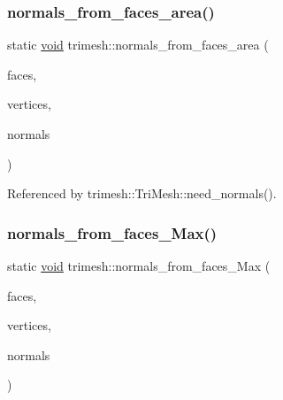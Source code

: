 \subsubsection{\texorpdfstring{normals\+\_\+from\+\_\+faces\+\_\+area()}{normals\_from\_faces\_area()}}
{\footnotesize\ttfamily static \hyperlink{namespacetrimesh_a784ddfd979e1c579bda795a8edfc3f43}{void} trimesh\+::normals\+\_\+from\+\_\+faces\+\_\+area (\begin{DoxyParamCaption}\item[{vector$<$ \hyperlink{classtrimesh_1_1TriMesh_a06cb64bb6435d5cf4d7b24d2950fe8e7}{Tri\+Mesh\+::\+Face} $>$ \&}]{faces,  }\item[{vector$<$ \hyperlink{namespacetrimesh_a325b99fd6454b22fa4c4bc3223271b2c}{point} $>$ \&}]{vertices,  }\item[{vector$<$ \hyperlink{namespacetrimesh_a4fc2b83feba99c931f837a0c7d4b4df1}{vec} $>$ \&}]{normals }\end{DoxyParamCaption})\hspace{0.3cm}{\ttfamily [static]}}



Referenced by trimesh\+::\+Tri\+Mesh\+::need\+\_\+normals().

\mbox{\label{namespacetrimesh_a1b5789b29f63886b4c31128730373bbb}} 
\subsubsection{\texorpdfstring{normals\+\_\+from\+\_\+faces\+\_\+\+Max()}{normals\_from\_faces\_Max()}}
{\footnotesize\ttfamily static \hyperlink{namespacetrimesh_a784ddfd979e1c579bda795a8edfc3f43}{void} trimesh\+::normals\+\_\+from\+\_\+faces\+\_\+\+Max (\begin{DoxyParamCaption}\item[{vector$<$ \hyperlink{classtrimesh_1_1TriMesh_a06cb64bb6435d5cf4d7b24d2950fe8e7}{Tri\+Mesh\+::\+Face} $>$ \&}]{faces,  }\item[{vector$<$ \hyperlink{namespacetrimesh_a325b99fd6454b22fa4c4bc3223271b2c}{point} $>$ \&}]{vertices,  }\item[{vector$<$ \hyperlink{namespacetrimesh_a4fc2b83feba99c931f837a0c7d4b4df1}{vec} $>$ \&}]{normals }\end{DoxyParamCaption})\hspace{0.3cm}{\ttfamily [static]}}



